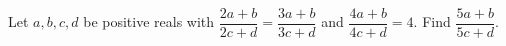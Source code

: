 Let $a,b,c,d$ be positive reals with $\dfrac{2a+b}{2c+d}=\dfrac{3a+b}{3c+d}$ and $\dfrac{4a+b}{4c+d}=4$. Find $\dfrac{5a+b}{5c+d}$.
